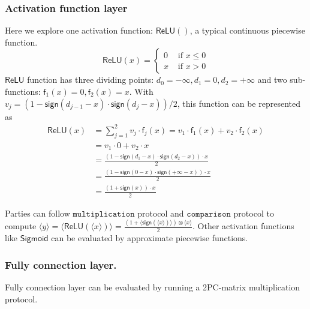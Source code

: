 \documentclass[letterpaper]{article} %
\begin{document}
    \subsubsection{Activation function layer}
    Here we explore one  activation function: $\mathsf{ReLU}()$, a typical continuous piecewise function.
    $$\mathsf{ReLU}(x)=\begin{cases}
        0 & \text{ if } x \leqslant 0  \\
        x & \text{ if } x > 0
        \end{cases}$$
    $\mathsf{ReLU}$ function has three dividing points: $d_{0}= -\infty ,d_{1}= 0, d_{2}=+\infty$ and two sub-functions:
    $\mathsf{f}_{1}(x)= 0 ,\mathsf{f}_{2}(x)= x$.
    With $v_{j} = (1-\mathsf{sign}(d_{j-1}-x)\cdot \mathsf{sign}(d_{j}-x))/2$, this function can be represented as
    \begin{align*}
        \mathsf{ReLU}(x)&=\sum_{j=1}^{2}v_{j}\cdot \mathsf{f}_{j}(x)=v_{1}\cdot \mathsf{f}_{1}(x)+v_{2}\cdot \mathsf{f}_{2}(x)\\
        &=v_{1}\cdot 0 +v_{2}\cdot x\\
        &=\frac{(1-\mathsf{sign}(d_{1}-x)\cdot \mathsf{sign}(d_{2}-x))\cdot x}{2} \\
        &=\frac{(1-\mathsf{sign}(0-x)\cdot \mathsf{sign}(+\infty -x))\cdot x}{2} \\
        &=\frac{(1+\mathsf{sign}(x))\cdot x}{2}
    \end{align*}

    Parties can follow $\mathtt{multiplication}$ protocol and $\mathtt{comparison}$ protocol to compute
    $\langle y\rangle=\langle \mathsf{ReLU}(\langle x\rangle)\rangle=\frac{(1+\langle \mathsf{sign}(\langle x\rangle)\rangle)\otimes \langle x\rangle}{2}$.
    Other activation functions like $\mathsf{Sigmoid}$ can be evaluated by
    approximate piecewise functions.

    \subsubsection{Fully connection layer.}
    Fully connection layer can be evaluated by running a 2PC-matrix
    multiplication protocol.
\end{document}
